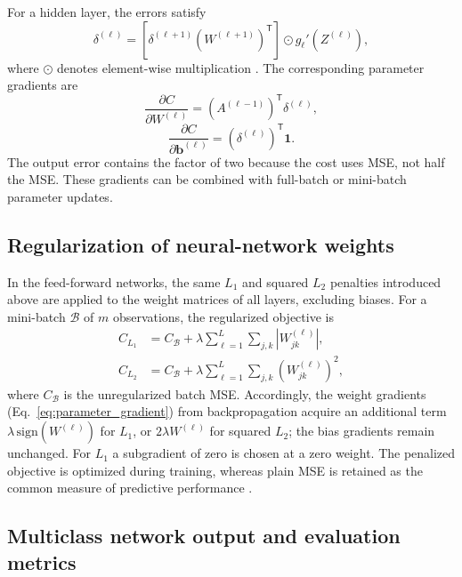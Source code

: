 \documentclass[aps,rmp,reprint,amsmath,amssymb,graphicx,longbibliography]{revtex4-1}
\begin{document}
For a hidden layer, the errors satisfy
\begin{equation}
 \delta^{(\ell)}=\left[\delta^{(\ell+1)}
   (W^{(\ell+1)})^{\mathsf T}\right]
   \odot g_\ell'\!\left(Z^{(\ell)}\right),
\end{equation}
where $\odot$ denotes element-wise multiplication \cite{Book_Ch8}. The corresponding
parameter gradients are
\begin{equation}
 \frac{\partial C}{\partial W^{(\ell)}}
   =(A^{(\ell-1)})^{\mathsf T}\delta^{(\ell)},
   \label{eq:parameter_gradient}
\end{equation}
\begin{equation}
 \frac{\partial C}{\partial \mathbf b^{(\ell)}}
   =(\delta^{(\ell)})^{\mathsf T}\mathbf{1}.
\end{equation}
The output error contains the factor of two because the cost uses MSE,
not half the MSE. These gradients can be combined with full-batch or
mini-batch parameter updates.


\subsection{Regularization of neural-network weights}
\label{subsec:nn_regularization_theory}

In the feed-forward networks, the same $L_1$ and squared $L_2$
penalties introduced above are applied to the weight matrices of
all layers, excluding biases. For a mini-batch $\mathcal{B}$ of
$m$ observations, the regularized objective is
\begin{align}
 C_{L_1} &= C_{\mathcal{B}}+
   \lambda\sum_{\ell=1}^{L}\sum_{j,k}|W_{jk}^{(\ell)}|,\\
 C_{L_2} &= C_{\mathcal{B}}+
   \lambda\sum_{\ell=1}^{L}\sum_{j,k}(W_{jk}^{(\ell)})^2,
\end{align}
where $C_{\mathcal{B}}$ is the unregularized batch MSE.
Accordingly, the weight gradients (Eq.~\eqref{eq:parameter_gradient}) from backpropagation acquire an
additional term $\lambda\,\mathrm{sign}(W^{(\ell)})$ for $L_1$, or
$2\lambda W^{(\ell)}$ for squared $L_2$; the bias gradients remain
unchanged. For $L_1$ a subgradient of zero is chosen at a zero weight.
The penalized objective is optimized during training, whereas plain MSE
is retained as the common measure of predictive performance
\cite{Book_Ch8}.


\subsection{Multiclass network output and evaluation metrics}
\label{subsec:mnist_theory}
\end{document}
